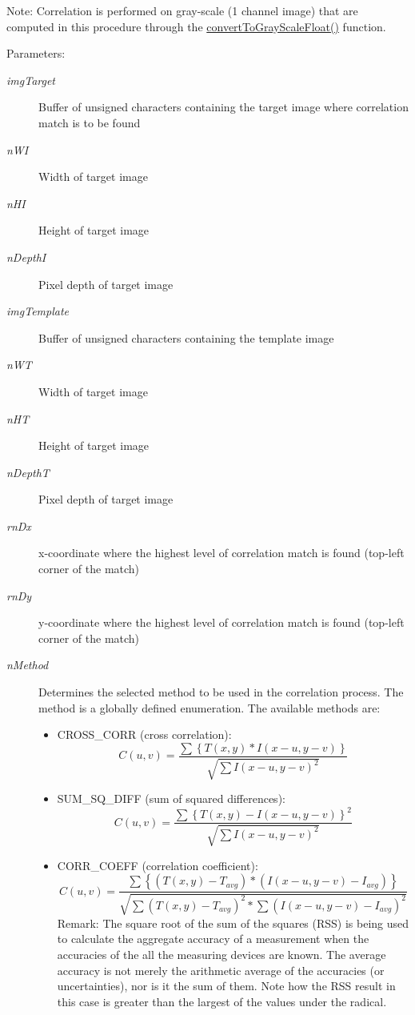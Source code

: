 \begin{Desc}
\item[Note:]Correlation is performed on gray-scale (1 channel image) that are computed in this procedure through the \hyperlink{classQcorr_d1b26ace597c0c4a0f64a0bd9576d4fc}{convertToGrayScaleFloat()} function. \end{Desc}
\begin{Desc}
\item[Parameters:]
\begin{description}
\item[{\em imgTarget}]Buffer of unsigned characters containing the target image where correlation match is to be found \item[{\em nWI}]Width of target image \item[{\em nHI}]Height of target image \item[{\em nDepthI}]Pixel depth of target image \item[{\em imgTemplate}]Buffer of unsigned characters containing the template image \item[{\em nWT}]Width of target image \item[{\em nHT}]Height of target image \item[{\em nDepthT}]Pixel depth of target image \item[{\em rnDx}]x-coordinate where the highest level of correlation match is found (top-left corner of the match) \item[{\em rnDy}]y-coordinate where the highest level of correlation match is found (top-left corner of the match) \item[{\em nMethod}]Determines the selected method to be used in the correlation process. The method is a globally defined enumeration. The available methods are:\begin{itemize}
\item CROSS\_\-CORR (cross correlation): \[ C(u,v) = \frac {\sum{\left\{T(x,y) * I(x-u,y-v)\right\}}} {\sqrt{ \sum{I(x-u,y-v)^2}}} \]\item SUM\_\-SQ\_\-DIFF (sum of squared differences): \[ C(u,v) = \frac {\sum{\left\{T(x,y)-I(x-u,y-v)\right\}^2}} {\sqrt{\sum{I(x-u,y-v)^2}}} \]\item CORR\_\-COEFF (correlation coefficient): \[ C(u,v) = \frac {\sum{\left\{(T(x,y)-T_{avg}) * (I(x-u,y-v)-I_{avg})\right\}}} {\sqrt{\sum{(T(x,y)-T_{avg})^2} * \sum{(I(x-u,y-v)-I_{avg})^2}}} \] Remark: The square root of the sum of the squares (RSS) is being used to calculate the aggregate accuracy of a measurement when the accuracies of the all the measuring devices are known. The average accuracy is not merely the arithmetic average of the accuracies (or uncertainties), nor is it the sum of them. Note how the RSS result in this case is greater than the largest of the values under the radical.\end{itemize}

\end{description}
\end{Desc}
